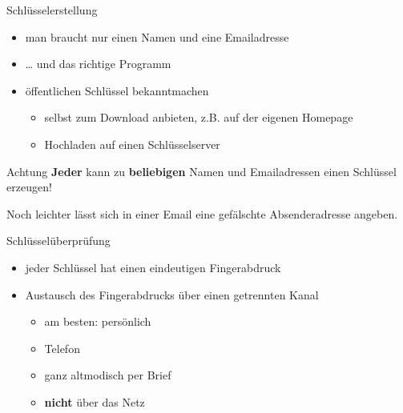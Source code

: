 \begin{frame}{Schlüsselerstellung}
  \begin{itemize}
    \item man braucht nur einen Namen und eine Emailadresse
    \item … und das richtige Programm
    \item öffentlichen Schlüssel bekanntmachen
      \begin{itemize}
	\item selbst zum Download anbieten, z.B. auf der eigenen Homepage
	\item Hochladen auf einen Schlüsselserver
      \end{itemize}
  \end{itemize}


\end{frame}

\begin{frame}{}
  \begin{alertblock}{Achtung}
    \textbf{Jeder} kann zu \textbf{beliebigen} Namen und Emailadressen einen
    Schlüssel erzeugen!
  \end{alertblock}

  Noch leichter lässt sich in einer Email eine gefälschte Absenderadresse
  angeben.

\end{frame}

\begin{frame}{Schlüsselüberprüfung}
  \begin{itemize}
    \item jeder Schlüssel hat einen eindeutigen Fingerabdruck
    \item Austausch des Fingerabdrucks über einen getrennten Kanal
      \begin{itemize}
	\item am besten: persönlich
	\item Telefon
	\item ganz altmodisch per Brief
	\item \textbf{nicht} über das Netz
      \end{itemize}
  \end{itemize}


\end{frame}

